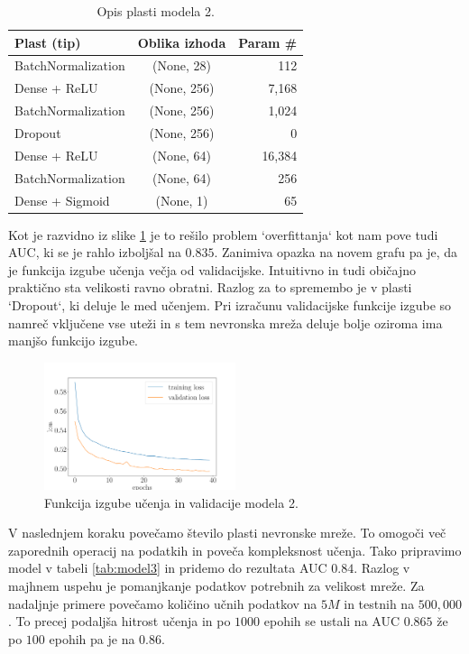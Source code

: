 \documentclass{article}
\begin{document}
\begin{table}[H]
\centering
\begin{tabular}{|l|c|r|}
\hline
\textbf{Plast (tip)} & \textbf{Oblika izhoda} & \textbf{Param \#} \\
\hline
BatchNormalization		& (None, 28)		   & 112			   \\
Dense + ReLU           & (None, 256)           & 7,168             \\
BatchNormalization     & (None, 256)           & 1,024             \\
Dropout                & (None, 256)           & 0                 \\
Dense + ReLU           & (None, 64)            & 16,384            \\
BatchNormalization     & (None, 64)            & 256               \\
Dense + Sigmoid        & (None, 1)             & 65                \\
\hline
\end{tabular}
\caption{Opis plasti modela 2.}
\label{tab:model2}
\end{table}
Kot je razvidno iz slike \ref{fig:loss} je to rešilo problem `overfittanja` kot nam pove tudi AUC, ki se je rahlo izboljšal na $0.835$. Zanimiva opazka na novem grafu pa je, da je funkcija izgube učenja večja od validacijske. Intuitivno in tudi običajno praktično sta velikosti ravno obratni. Razlog za to spremembo je v plasti `Dropout`, ki deluje le med učenjem. Pri izračunu validacijske funkcije izgube so namreč vključene vse uteži in s tem nevronska mreža deluje bolje oziroma ima manjšo funkcijo izgube.
\begin{figure}[H]
\centering
	\includegraphics[width=0.5\textwidth]{images/normalloss.pdf}
	\caption{Funkcija izgube učenja in validacije modela 2.}
	\label{fig:loss}
\end{figure}
V naslednjem koraku povečamo število plasti nevronske mreže. To omogoči več zaporednih operacij na podatkih in poveča kompleksnost učenja. Tako pripravimo model v tabeli \ref{tab:model3} in pridemo do rezultata AUC $0.84$. Razlog v majhnem uspehu je pomanjkanje podatkov potrebnih za velikost mreže. Za nadaljnje primere povečamo količino učnih podatkov na $5M$ in testnih na $500{,}000$. To precej podaljša hitrost učenja in po $1000$ epohih se ustali na AUC $0.865$ že po $100$ epohih pa je na $0.86$.
\end{document}
